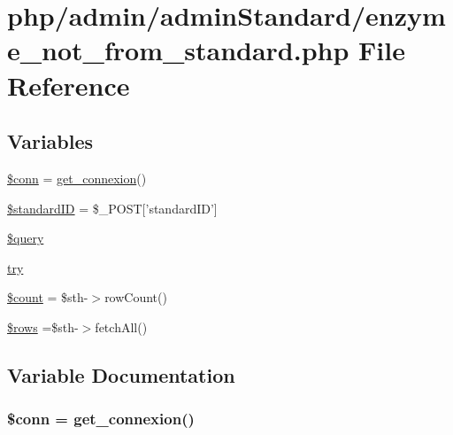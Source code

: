 \hypertarget{enzyme__not__from__standard_8php}{\section{php/admin/admin\-Standard/enzyme\-\_\-not\-\_\-from\-\_\-standard.php File Reference}
\label{enzyme__not__from__standard_8php}
}
\subsection*{Variables}
\begin{DoxyCompactItemize}
\item 
\hyperlink{enzyme__not__from__standard_8php_aa8a5a87b9c1a6a0819b88447cbe41877}{\$conn} = \hyperlink{php__functions_8php_ace18bc10f3fd08f92688ac743e0d8c2e}{get\-\_\-connexion}()
\item 
\hyperlink{enzyme__not__from__standard_8php_a0c541a369e4a0434108a7d145751bb23}{\$standard\-I\-D} = \$\-\_\-\-P\-O\-S\-T\mbox{[}'standard\-I\-D'\mbox{]}
\item 
\hyperlink{enzyme__not__from__standard_8php_af59a5f7cd609e592c41dc3643efd3c98}{\$query}
\item 
\hyperlink{enzyme__not__from__standard_8php_abe4cc9788f52e49485473dc699537388}{try}
\item 
\hyperlink{enzyme__not__from__standard_8php_af789423037bbc89dc7c850e761177570}{\$count} = \$sth-\/$>$row\-Count()
\item 
\hyperlink{enzyme__not__from__standard_8php_ace2ec39e7df3899fa8df9640ec274b03}{\$rows} =\$sth-\/$>$fetch\-All()
\end{DoxyCompactItemize}


\subsection{Variable Documentation}
\hypertarget{enzyme__not__from__standard_8php_aa8a5a87b9c1a6a0819b88447cbe41877}{
\subsubsection[{\$conn}]{\setlength{\rightskip}{0pt plus 5cm}\$conn = {\bf get\-\_\-connexion}()}}\label{enzyme__not__from__standard_8php_aa8a5a87b9c1a6a0819b88447cbe41877}


